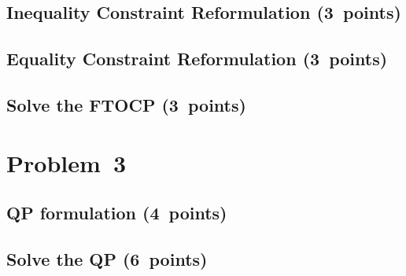 \documentclass{article}
\begin{document}
\subsection{Inequality Constraint Reformulation (3~points)}
\subsection{Equality Constraint Reformulation (3~points)}
\subsection{Solve the FTOCP (3~points)}

\section{Problem~3}
\subsection{QP formulation (4~points)}
\subsection{Solve the QP (6~points)}
\end{document}
